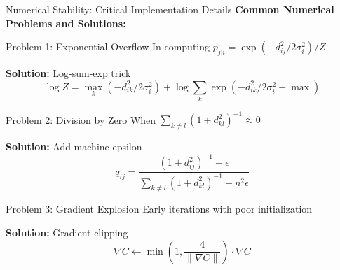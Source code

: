 \begin{frame}{Numerical Stability: Critical Implementation Details}
\textbf{Common Numerical Problems and Solutions:}

\begin{block}{Problem 1: Exponential Overflow}
In computing $p_{j|i} = \exp(-d_{ij}^2/2\sigma_i^2) / Z$

\textbf{Solution:} Log-sum-exp trick
$$\log Z = \max_k(-d_{ik}^2/2\sigma_i^2) + \log\sum_k \exp(-d_{ik}^2/2\sigma_i^2 - \max)$$
\end{block}

\begin{block}{Problem 2: Division by Zero}
When $\sum_{k \neq l}(1 + d_{kl}^2)^{-1} \approx 0$

\textbf{Solution:} Add machine epsilon
$$q_{ij} = \frac{(1 + d_{ij}^2)^{-1} + \epsilon}{\sum_{k \neq l}(1 + d_{kl}^2)^{-1} + n^2\epsilon}$$
\end{block}

\begin{block}{Problem 3: Gradient Explosion}
Early iterations with poor initialization

\textbf{Solution:} Gradient clipping
$$\nabla C \leftarrow \min\left(1, \frac{4}{\|\nabla C\|}\right) \cdot \nabla C$$
\end{block}
\end{frame}

